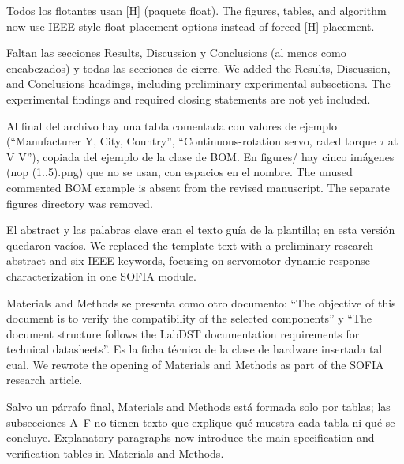 \documentclass{LabDSTresponse}
\begin{document}
	{Todos los flotantes usan [H] (paquete float).}
	{The figures, tables, and algorithm now use IEEE-style float placement options instead of forced [H] placement.}
	
	{Faltan las secciones Results, Discussion y Conclusions (al menos como encabezados) y todas las secciones de cierre.}
	{We added the Results, Discussion, and Conclusions headings, including preliminary experimental subsections. The experimental findings and required closing statements are not yet included.}
	
	{Al final del archivo hay una tabla comentada con valores de ejemplo (“Manufacturer Y, City, Country”, “Continuous-rotation servo, rated torque
		$\tau$ at V V”), copiada del ejemplo de la clase de BOM. En figures/ hay cinco imágenes (nop (1..5).png) que no se usan, con espacios en el nombre.}
	{The unused commented BOM example is absent from the revised manuscript. The separate figures directory was removed.}
	
	
	{El abstract y las palabras clave eran el texto guía de la plantilla; en esta versión quedaron vacíos.}
	{We replaced the template text with a preliminary research abstract and six IEEE keywords, focusing on servomotor dynamic-response characterization in one SOFIA module.}
	
	{Materials and Methods se presenta como otro documento: “The objective of this document is to verify
		the compatibility of the selected components” y “The document structure follows the LabDST
		documentation requirements for technical datasheets”. Es la ficha técnica de la clase de hardware insertada tal cual.}
	{We rewrote the opening of Materials and Methods as part of the SOFIA research article.}
	
	
	{Salvo un párrafo final, Materials and Methods está formada solo por tablas; las subsecciones A–F no tienen texto que explique qué muestra cada tabla ni qué se concluye.}
	{Explanatory paragraphs now introduce the main specification and verification tables in Materials and Methods.}
	
\end{document}
